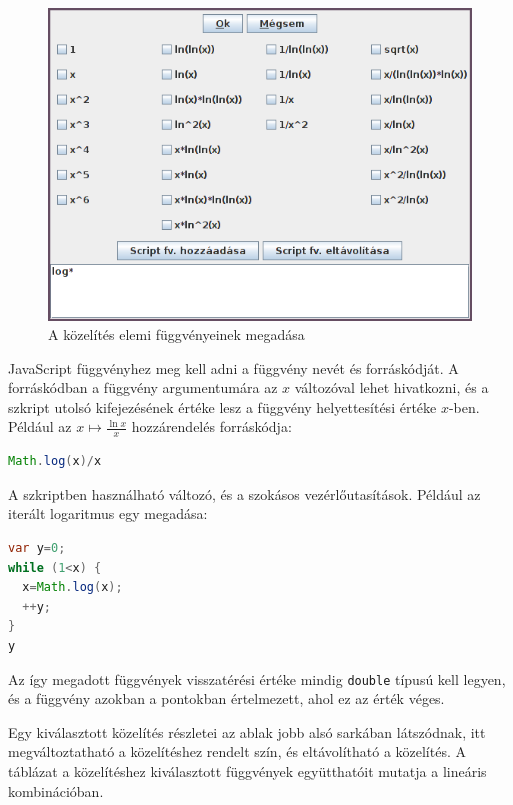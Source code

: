 \begin{figure}[H]
\caption{A közelítés elemi függvényeinek megadása}
\centering
\includegraphics[scale=0.75]{functions}
\end{figure}

JavaScript függvényhez meg kell adni a függvény nevét és forráskódját.
A forráskódban a függvény argumentumára az $x$ változóval lehet hivatkozni, és a szkript utolsó kifejezésének értéke lesz a függvény helyettesítési értéke $x$-ben.
Például az $x \mapsto \frac{\ln{x}}{x}$ hozzárendelés forráskódja:

\begin{lstlisting}[basicstyle=\small\ttfamily, language=Java]
Math.log(x)/x
\end{lstlisting}

A szkriptben használható változó, és a szokásos vezérlőutasítások.
Például az iterált logaritmus egy megadása:
\begin{lstlisting}[basicstyle=\small\ttfamily, language=Java, morekeywords=var]
var y=0;
while (1<x) {
  x=Math.log(x);
  ++y;
}
y
\end{lstlisting}

Az így megadott függvények visszatérési értéke mindig \texttt{double} típusú kell legyen,
és a függvény azokban a pontokban értelmezett, ahol ez az érték véges.

Egy kiválasztott közelítés részletei az ablak jobb alsó sarkában látszódnak, itt megváltoztatható a közelítéshez rendelt szín, és eltávolítható a közelítés.
A táblázat a közelítéshez kiválasztott függvények együtthatóit mutatja a lineáris kombinációban.

